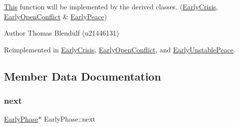\mbox{\hyperlink{class_this}{This}} function will be implemented by the derived classes. (\mbox{\hyperlink{class_early_crisis}{Early\+Crisis}}, \mbox{\hyperlink{class_early_open_conflict}{Early\+Open\+Conflict}} \& \mbox{\hyperlink{class_early_peace}{Early\+Peace}}) 

\begin{DoxyAuthor}{Author}
Thomas Blendulf (u21446131) 
\end{DoxyAuthor}


Reimplemented in \mbox{\hyperlink{class_early_crisis_af25e06788b565ba54a431175ab4c3c53}{Early\+Crisis}}, \mbox{\hyperlink{class_early_open_conflict_a5326352607a97d660280fc97da533cf6}{Early\+Open\+Conflict}}, and \mbox{\hyperlink{class_early_unstable_peace_ab48c4136bd2efb74c74c537f697bfd0c}{Early\+Unstable\+Peace}}.



\subsection{Member Data Documentation}
\mbox{\label{class_early_phase_a972cc28503787c749cad7b611204c951}} 
\subsubsection{\texorpdfstring{next}{next}}
{\footnotesize\ttfamily \mbox{\hyperlink{class_early_phase}{Early\+Phase}}$\ast$ Early\+Phase\+::next}

